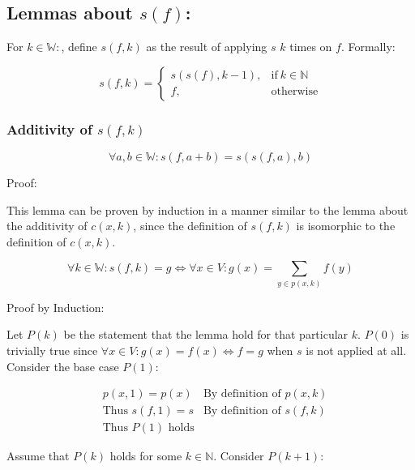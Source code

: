 \documentclass[11pt]{article}
\begin{document}
\subsection{Lemmas about $s(f)$:}

For $k\in \mathbb{W}:$, define $s(f,k)$ as the result of applying $s$ $k$ times on $f$. Formally:

\begin{equation}
    s(f,k)=
        \begin{cases}
            s(s(f),k-1), & \text{if}\ k \in \mathbb{N} \\
            f, & \text{otherwise}
        \end{cases}
\end{equation}

\subsubsection{Additivity of $s(f,k)$}

\begin{equation}
    \forall a,b \in \mathbb{W}: s(f,a+b) = s(s(f,a),b)
\end{equation}

Proof:

This lemma can be proven by induction in a manner similar to the lemma about the additivity of $c(x,k)$, since the definition of $s(f,k)$ is isomorphic to the definition of $c(x,k)$.

\begin{equation}
    \forall k \in \mathbb{W}: s(f,k)=g \Leftrightarrow \forall x \in V: g(x) = \sum_{y \in p(x,k)} f(y)
\end{equation}

Proof by Induction:

Let $P(k)$ be the statement that the lemma hold for that particular $k$. $P(0)$ is trivially true since $\forall x \in V: g(x) = f(x) \Leftrightarrow f=g$ when $s$ is not applied at all. Consider the base case $P(1)$:

\begin{align*}
& \text{$p(x,1)=p(x)$} & \text{By definition of $p(x,k)$} \\
& \text{Thus $s(f,1)=s$} & \text{By definition of $s(f,k)$} \\
& \text{Thus $P(1)$ holds} & \text{}
\end{align*}

Assume that $P(k)$ holds for some $k\in \mathbb{N}$. Consider $P(k+1)$:
\end{document}
